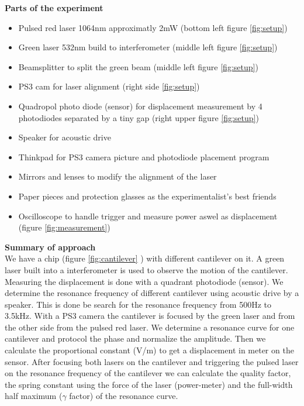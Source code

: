 \documentclass[12pt,a4paper]{article}
\begin{document}
\begin{multicols}{2}
\textbf{Parts of the experiment}
\begin{itemize}
	\item Pulsed red laser 1064nm approximatly 2mW (bottom left figure \ref{fig:setup})
	\item Green laser 532nm build to interferometer (middle left figure \ref{fig:setup})
	\item Beamsplitter to split the green beam (middle left figure \ref{fig:setup})
	\item PS3 cam for laser alignment (right side \ref{fig:setup})
	\item Quadropol photo diode (sensor) for displacement measurement by 4 photodiodes separated by a tiny gap (right upper figure \ref{fig:setup})
	\item Speaker for acoustic drive 
	\item Thinkpad for PS3 camera picture and photodiode placement program
	\item Mirrors and lenses to modify the alignment of the laser
	\item Paper pieces and protection glasses as the experimentalist's best friends
	\item Oscilloscope to handle trigger and measure power aswel as displacement (figure \ref{fig:measurement})
\end{itemize}

\textbf{Summary of approach}\\
We have a chip (figure \ref{fig:cantilever} ) with different cantilever on it. A green laser built into a interferometer is used to observe the motion of the cantilever. Measuring the displacement is done with a quadrant photodiode (sensor). We determine the resonance frequency of different cantilever using acoustic drive by a speaker. This is done be search for the resonance frequency from 500Hz to 3.5kHz. With a PS3 camera the cantilever is focused by the green laser and from the other side from the pulsed red laser. We determine a resonance curve for one cantilever and protocol the phase and normalize the amplitude. Then we calculate the proportional constant (V/m) to get a displacement in meter on the sensor. After focusing both lasers on the cantilever and triggering the pulsed laser on the resonance frequency of the cantilever we can calculate the quality factor, the spring constant using the force of the laser (power-meter) and the full-width half maximum ($\gamma$ factor) of the resonance curve.


\end{multicols}
\end{document}
